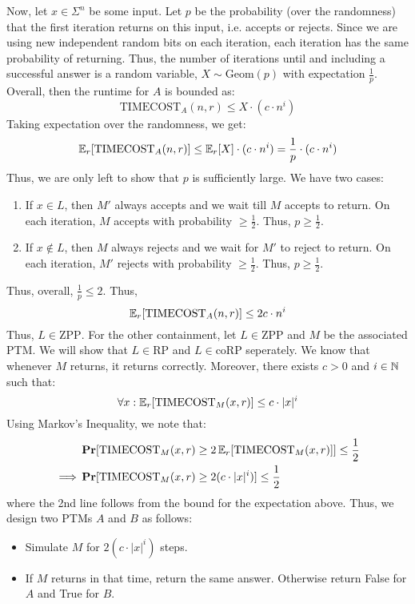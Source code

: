 \documentclass[12pt]{article}
\begin{document}
\begin{solution}
    Now, let $x \in \Sigma^n$ be some input. Let $p$ be the probability (over the randomness) that the first iteration  returns on this input, i.e. accepts or rejects. Since we are using new independent random bits on each iteration, each iteration has the same probability of returning. Thus, the number of iterations until and including a successful answer is a random variable, $X \sim \text{Geom}(p)$ with expectation $\frac{1}{p}$. \bbni
    Overall, then the runtime for $A$ is bounded as: 
    \[ \text{TIMECOST}_A(n, r) \leq X \cdot (c \cdot n^i)\]
    Taking expectation over the randomness, we get:
    \[ \operatorname{\mathbb{E}}_r[\text{TIMECOST}_A(n, r)] \leq \operatorname{\mathbb{E}}_r[X] \cdot (c \cdot n^i) = \frac{1}{p} \cdot (c \cdot n^i)\]
    Thus, we are only left to show that $p$ is sufficiently large. We have two cases: 
    \begin{enumerate}
        \item If $x \in L$, then $M'$ always accepts and we wait till $M$ accepts to return. On each iteration, $M$ accepts with probability $\geq \frac{1}{2}$. Thus, $p \geq \frac{1}{2}$. 
        \item If $x \not \in L$, then $M$ always rejects and we wait for $M'$ to reject to return. On each iteration, $M'$ rejects with probability $\geq \frac{1}{2}$. Thus, $p \geq \frac{1}{2}$. 
    \end{enumerate}
    Thus, overall, $\frac{1}{p} \leq 2$. Thus, 
    \[ \operatorname{\mathbb{E}}_r[\text{TIMECOST}_A(n, r)] \leq 2c \cdot n^i \]
    Thus, $L \in \text{ZPP}$. \bbni
    For the other containment, let $L \in \text{ZPP}$ and $M$ be the associated PTM. We will show that $L \in \text{RP}$ and $L \in \text{coRP}$ seperately. \bbni
    We know that whenever $M$ returns, it returns correctly. Moreover, there exists $c > 0$ and $i \in \mathbb N$ such that: 
    \[\forall x : \operatorname{\mathbb{E}}_r[\text{TIMECOST}_M(x, r)] \leq c \cdot |x|^i\]
    Using Markov's Inequality, we note that:
    \begin{align*}
        &\operatorname{\mathbf{Pr}}[\text{TIMECOST}_M(x,r) \geq 2\operatorname{\mathbb{E}}_r[\text{TIMECOST}_M(x, r)]] \leq \frac{1}{2} \\
        \implies &\operatorname{\mathbf{Pr}}[\text{TIMECOST}_M(x,r) \geq 2(c\cdot |x|^i)] \leq \frac{1}{2}
    \end{align*}
    where the 2nd line follows from the bound for the expectation above. Thus, we design two PTMs $A$ and $B$ as follows:
    \begin{itemize}
        \item Simulate $M$ for $2(c \cdot |x|^i)$ steps. 
        \item If $M$ returns in that time, return the same answer. Otherwise return False for $A$ and True for $B$. 

\end{itemize}
\end{solution}
\end{document}
